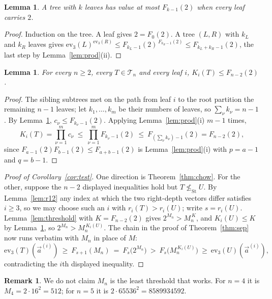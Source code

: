 \documentclass[11pt,a4paper]{article}
\theoremstyle{plain}
\newtheorem{lemma}[theorem]{Lemma}
\theoremstyle{definition}
\newtheorem{remark}[theorem]{Remark}
\newcommand{\ev}{\mathrm{ev}}
\newcommand{\Tam}{\mathcal{T}}
\newcommand{\St}{\mathrm{St}}
\begin{document}
\begin{lemma}\label{lem:maxval}
A tree with $k$ leaves has value at most $F_{k-1}(2)$ when every leaf carries $2$.
\end{lemma}

\begin{proof}
Induction on the tree. A leaf gives $2=F_0(2)$. A tree $(L,R)$ with $k_L$ and $k_R$
leaves gives $\ev_3(L)^{\ev_3(R)}\le F_{k_L-1}(2)^{\,F_{k_R-1}(2)}\le F_{k_L+k_R-1}(2)$, the
last step by Lemma~\ref{lem:prod}(ii).
\end{proof}

\begin{lemma}\label{lem:Kbound}
For every $n\ge2$, every $T\in\Tam_n$ and every leaf $i$, $K_i(T)\le F_{n-2}(2)$.
\end{lemma}

\begin{proof}
The sibling subtrees met on the path from leaf $i$ to the root partition the remaining
$n-1$ leaves; let $k_1,\dots,k_m$ be their numbers of leaves, so $\sum_\nu k_\nu=n-1$.
By Lemma~\ref{lem:maxval}, $c_\nu\le F_{k_\nu-1}(2)$. Applying
Lemma~\ref{lem:prod}(i) $m-1$ times,
\[
  K_i(T)=\prod_{\nu=1}^{m}c_\nu\ \le\ \prod_{\nu=1}^{m}F_{k_\nu-1}(2)
  \ \le\ F_{\left(\sum_\nu k_\nu\right)-1}(2)=F_{n-2}(2),
\]
since $F_{a-1}(2)F_{b-1}(2)\le F_{a+b-1}(2)$ is Lemma~\ref{lem:prod}(i) with $p=a-1$ and
$q=b-1$.
\end{proof}

\begin{proof}[Proof of Corollary~\ref{cor:test}]
One direction is Theorem~\ref{thm:chow}. For the other, suppose the $n-2$ displayed
inequalities hold but $T\not\le_{\St}U$. By Lemma~\ref{lem:r12} any index at which the
two right-depth vectors differ satisfies $i\ge3$, so we may choose such an $i$ with
$r_i(T)>r_i(U)$; write
$s=r_i(U)$. Lemma~\ref{lem:threshold} with $K=F_{n-2}(2)$ gives $2^{M_n}>M_n^{\,K}$, and
$K_i(U)\le K$ by Lemma~\ref{lem:Kbound}, so $2^{M_n}>M_n^{\,K_i(U)}$. The chain in the
proof of Theorem~\ref{thm:sep} now runs verbatim with $M_n$ in place of $M$:
\[
  \ev_3(T)(\vec a^{(i)})\ \ge\ F_{s+1}(M_n)\ =\ F_s\bigl(2^{M_n}\bigr)
  \ >\ F_s\bigl(M_n^{\,K_i(U)}\bigr)\ \ge\ \ev_3(U)(\vec a^{(i)}),
\]
contradicting the $i$th displayed inequality.
\end{proof}

\begin{remark}\label{rem:notleast}
We do not claim $M_n$ is the least threshold that works. For $n=4$ it is
$M_4=2\cdot16^{2}=512$; for $n=5$ it is $2\cdot65536^{2}=8589934592$.
\end{remark}
\end{document}
